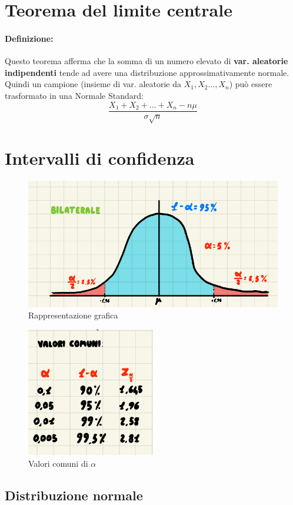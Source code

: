 \documentclass[]{article}
\newcommand{\definizione}{\paragraph{Definizione:}}
\begin{document}
    \section{Teorema del limite centrale}
    \definizione Questo teorema afferma che la somma di un numero elevato di \textbf{var. aleatorie indipendenti} tende ad avere una distribuzione approssimativamente normale.\\
    Quindi un campione (insieme di var. aleatorie da $X_1, X_2\ldots, X_n$) può essere trasformato in una Normale Standard:
    \[ \frac{X_1 + X_2 + \ldots + X_n - n\mu}{\sigma \sqrt{n}} \]
    \section{Intervalli di confidenza}
    \begin{figure}[H]
        \caption{Rappresentazione grafica}
        \includegraphics[width=\textwidth]{images/boh_16.png}
    \end{figure}
    \begin{figure}[H]
        \centering
            \caption{Valori comuni di $\alpha$}
            \includegraphics[width=0.5\textwidth]{images/boh_19.png}
    \end{figure}
    \subsection{Distribuzione normale}
\end{document}
